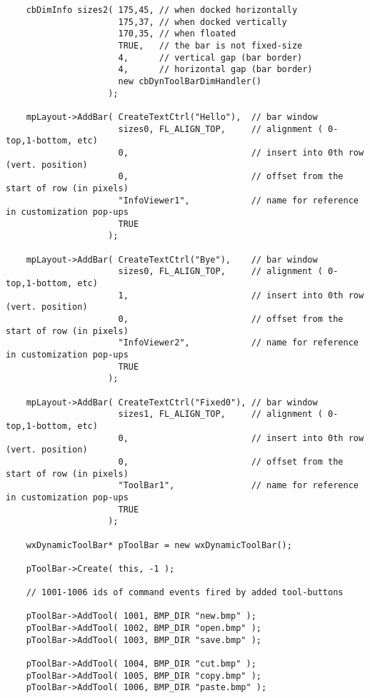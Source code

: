 \begin{verbatim}
    cbDimInfo sizes2( 175,45, // when docked horizontally      
                      175,37, // when docked vertically        
                      170,35, // when floated                  
                      TRUE,   // the bar is not fixed-size
                      4,      // vertical gap (bar border)
                      4,      // horizontal gap (bar border)
                      new cbDynToolBarDimHandler()
                    ); 
    
    mpLayout->AddBar( CreateTextCtrl("Hello"),  // bar window
                      sizes0, FL_ALIGN_TOP,     // alignment ( 0-top,1-bottom, etc)
                      0,                        // insert into 0th row (vert. position)
                      0,                        // offset from the start of row (in pixels)
                      "InfoViewer1",            // name for reference in customization pop-ups
                      TRUE
                    );
    
    mpLayout->AddBar( CreateTextCtrl("Bye"),    // bar window
                      sizes0, FL_ALIGN_TOP,     // alignment ( 0-top,1-bottom, etc)
                      1,                        // insert into 0th row (vert. position)
                      0,                        // offset from the start of row (in pixels)
                      "InfoViewer2",            // name for reference in customization pop-ups
                      TRUE
                    );
    
    mpLayout->AddBar( CreateTextCtrl("Fixed0"), // bar window
                      sizes1, FL_ALIGN_TOP,     // alignment ( 0-top,1-bottom, etc)
                      0,                        // insert into 0th row (vert. position)
                      0,                        // offset from the start of row (in pixels)
                      "ToolBar1",               // name for reference in customization pop-ups
                      TRUE
                    );
    
    wxDynamicToolBar* pToolBar = new wxDynamicToolBar();
    
    pToolBar->Create( this, -1 );
    
    // 1001-1006 ids of command events fired by added tool-buttons
    
    pToolBar->AddTool( 1001, BMP_DIR "new.bmp" );
    pToolBar->AddTool( 1002, BMP_DIR "open.bmp" );
    pToolBar->AddTool( 1003, BMP_DIR "save.bmp" );
    
    pToolBar->AddTool( 1004, BMP_DIR "cut.bmp" );
    pToolBar->AddTool( 1005, BMP_DIR "copy.bmp" );
    pToolBar->AddTool( 1006, BMP_DIR "paste.bmp" );   
    

\end{verbatim}
